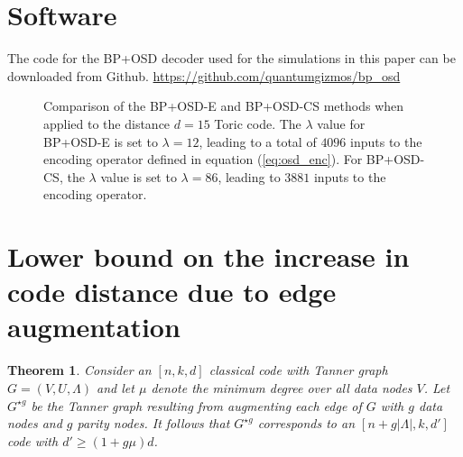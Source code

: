 \documentclass[%
 reprint,
superscriptaddress,
nofootinbib,
 amsmath,amssymb,
secnumarabic
]{revtex4-1}
\newtheorem{theorem}{Theorem}
\begin{document}
\section*{Software}
The code for the BP+OSD decoder used for the simulations in this paper can be downloaded from Github. \url{https://github.com/quantumgizmos/bp_osd}





% 


\appendix


\begin{figure}
	
	\caption{Comparison of the BP+OSD-E and BP+OSD-CS methods when applied to the distance $d=15$ Toric code. The $\lambda$ value for BP+OSD-E is set to $\lambda=12$, leading to a total of $4096$ inputs to the encoding operator defined in equation (\ref{eq:osd_enc}). For BP+OSD-CS, the $\lambda$ value is set to $\lambda=86$, leading to $3881$ inputs to the encoding operator.}
	\label{fig:comparison}
\end{figure}

\section{Lower bound on the increase in code distance due to edge augmentation}


\begin{theorem}
	\label{app:lower_bound}
	Consider an $[n,k,d]$ classical code with Tanner graph $G=(V,U,\Lambda)$ and let $\mu$ denote the minimum degree over all data nodes $V$.  Let $G^{\star g}$ be the Tanner graph resulting from augmenting each edge of $G$ with $g$ data nodes and $g$ parity nodes.  It follows that $G^{\star g}$ corresponds to an $[ n +g |\Lambda| , k , d'  ]$ code with $d' \geq (1+g \mu)d$.
\end{theorem}
\end{document}
